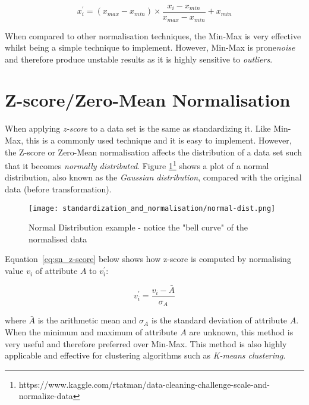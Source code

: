 \begin{equation}
\label{eq:sn_min-max-n}
x^{\prime}_{i} = (x_{max} - x_{min}) \times \frac{x_{i} - x_{min}}{x_{max} - x_{min}} + x_{min}
\end{equation}

 When compared to other normalisation techniques, the Min-Max is very effective whilst being a simple technique to implement\citep{al2006data}.  However, Min-Max is prone\emph{noise} and therefore produce unstable results as it is highly sensitive to \emph{outliers}\citep{jain2005score}.


\section{Z-score/Zero-Mean Normalisation}
When applying \emph{z-score} to a data set is the same as standardizing it.  Like Min-Max, this is a commonly used technique and it is easy to implement\citep{jain2005score}.  However, the Z-score or Zero-Mean normalisation affects the distribution of a data set such that it becomes \emph{normally distributed}.  Figure \ref{fig:sn_normal-dist}\footnote{https://www.kaggle.com/rtatman/data-cleaning-challenge-scale-and-normalize-data} shows a plot of a normal distribution, also known as the \emph{Gaussian distribution}, compared with the original data (before transformation).

\begin{figure}
	\texttt{[image: standardization\_and\_normalisation/normal-dist.png]}
	\caption{Normal Distribution example - notice the "bell curve" of the normalised data}
	\label{fig:sn_normal-dist}
\end{figure}

Equation~\ref{eq:sn_z-score} below shows how z-score is computed by normalising value $v_{i}$ of attribute $A$ to $v^{\prime}_{i}$:

\begin{equation}
\label{eq:sn_z-score}
v^{\prime}_{i} = \frac{v_{i} - \bar{A}}{\sigma_{A}}
\end{equation}

where $\bar{A}$ is the arithmetic mean and $\sigma_{A}$ is the standard deviation of attribute $A$.  When the minimum and maximum of attribute $A$ are unknown, this method is very useful and therefore preferred over Min-Max\citep{han2011data}.  This method is also highly applicable and effective for clustering algorithms such as \emph{K-means clustering}\citep{mohamad2013standardization}\citep{cheadle2003analysis}.

